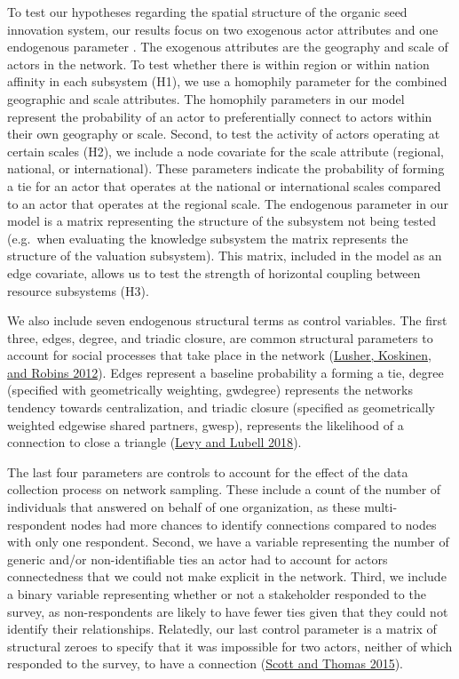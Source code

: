 \documentclass[twoside,12pt,final]{ucthesis-CA2012}
\begin{document}
\begin{ucmainmatter}
To test our hypotheses regarding the spatial structure of the organic
seed innovation system, our results focus on two exogenous actor
attributes and one endogenous parameter . The exogenous attributes are
the geography and scale of actors in the network. To test whether there
is within region or within nation affinity in each subsystem (H1), we
use a \textquotesingle homophily\textquotesingle{} parameter for the combined geographic and scale
attributes. The homophily parameters in our model represent the
probability of an actor to preferentially connect to actors within their
own geography or scale. Second, to test the activity of actors operating
at certain scales (H2), we include a node covariate for the scale
attribute (regional, national, or international). These parameters
indicate the probability of forming a tie for an actor that operates at
the national or international scales compared to an actor that operates
at the regional scale. The endogenous parameter in our model is a matrix
representing the structure of the subsystem not being tested (e.g.~when
evaluating the knowledge subsystem the matrix represents the structure
of the valuation subsystem). This matrix, included in the model as an
edge covariate, allows us to test the strength of horizontal coupling
between resource subsystems (H3).

We also include seven endogenous structural terms as control variables.
The first three, edges, degree, and triadic closure, are common
structural parameters to account for social processes that take place in
the network
(\protect\hyperlink{ref-Lusher_Koskinen_Robins_2012}{Lusher, Koskinen, and Robins 2012}).
Edges represent a baseline probability a forming a tie, degree
(specified with geometrically weighting, \textquotesingle gwdegree\textquotesingle) represents the
network\textquotesingle s tendency towards centralization, and triadic closure
(specified as geometrically weighted edgewise shared partners,
\textquotesingle gwesp\textquotesingle), represents the likelihood of a connection to close a
triangle (\protect\hyperlink{ref-Levy_Lubell_2018}{Levy and Lubell 2018}).

The last four parameters are controls to account for the effect of the
data collection process on network sampling. These include a count of
the number of individuals that answered on behalf of one organization,
as these multi-respondent nodes had more chances to identify connections
compared to nodes with only one respondent. Second, we have a variable
representing the number of generic and/or non-identifiable ties an actor
had to account for actors\textquotesingle{} connectedness that we could not make
explicit in the network. Third, we include a binary variable
representing whether or not a stakeholder responded to the survey, as
non-respondents are likely to have fewer ties given that they could not
identify their relationships. Relatedly, our last control parameter is a
matrix of \textquotesingle structural zeroes\textquotesingle{} to specify that it was impossible for
two actors, neither of which responded to the survey, to have a
connection
(\protect\hyperlink{ref-Scott_Thomas_2015}{Scott and Thomas 2015}).


\end{ucmainmatter}
\end{document}
